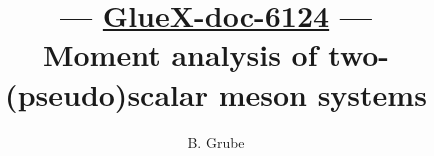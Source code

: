 \title{\textbf{--- \href{https://halldweb.jlab.org/doc-private/DocDB/ShowDocument?docid=6124}{GlueX-doc-6124} ---} \\
  Moment analysis of two-(pseudo)scalar meson systems}%



\author[1]{B. Grube}%

%
